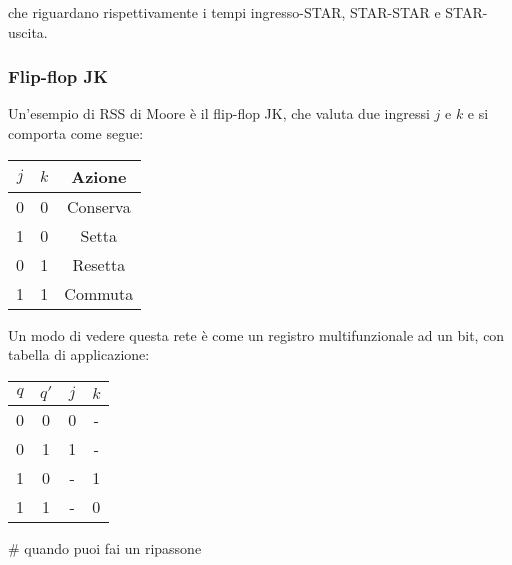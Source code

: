 \documentclass[a4paper,11pt]{article}
\begin{document}
che riguardano rispettivamente i tempi ingresso-STAR, STAR-STAR e STAR-uscita.

\subsubsection{Flip-flop JK}
Un'esempio di RSS di Moore è il flip-flop JK, che valuta due ingressi $j$ e $k$ e si comporta come segue:
\begin{table}[h!]
	\center {}
	\begin{tabular} { c | c | c }
		$j$ & $k$ & Azione \\ 
		\hline 
		0 & 0 & Conserva \\ 
		1 & 0 & Setta \\ 
		0 & 1 & Resetta \\ 
		1 & 1 & Commuta
	\end{tabular}
\end{table}

Un modo di vedere questa rete è come un registro multifunzionale ad un bit, con tabella di applicazione:
\begin{table}[h!]
	\center 
	\begin{tabular} { c  c | c  c }
		$q$ & $q'$ & $j$ & $k$ \\ 
		\hline 
		0 & 0 & 0 & - \\ 
		0 & 1 & 1 & - \\ 
		1 & 0 & - & 1 \\ 
		1 & 1 & - & 0
	\end{tabular}
\end{table}

# quando puoi fai un ripassone
\end{document}
